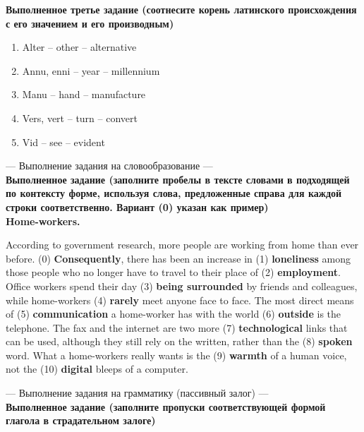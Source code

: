 \documentclass[main.tex]{subfiles}
\begin{document}
\textbf{Выполненное третье задание (соотнесите корень латинского происхождения с его значением и его производным)}

\begin{enumerate}[nosep]
	\itemsep\eitsp
	\item Alter -- other -- alternative
	\item Annu, enni -- year -- millennium
	\item Manu -- hand -- manufacture
	\item Vers, vert -- turn -- convert
	\item Vid -- see -- evident
\end{enumerate}
\vspace{7pt}

\newpage
{}

--- Выполнение задания на словообразование ---
\\

\textbf{Выполненное задание (заполните пробелы в тексте словами в подходящей по контексту форме, используя слова, предложенные справа для каждой строки соответственно. Вариант (0) указан как пример)}
\\

\textbf{Home-workers.}

According to government research, more people are working from home than ever before.
(0) \textbf{Consequently}, there has been an increase in (1) \textbf{loneliness} among those people who no longer have to travel to their place of (2) \textbf{employment}.
Office workers spend their day (3) \textbf{being surrounded} by friends and colleagues, while home-workers (4) \textbf{rarely} meet anyone face to face.
The most direct means of (5) \textbf{communication} a home-worker has with the world (6) \textbf{outside} is the telephone.
The fax and the internet are two more (7) \textbf{technological} links that can be used, although they still rely on the written, rather than the (8) \textbf{spoken} word.
What a home-workers really wants is the (9) \textbf{warmth} of a human voice, not the (10) \textbf{digital} bleeps of a computer.
\\

\newpage
{}

--- Выполнение задания на грамматику (пассивный залог) ---
\\

\textbf{Выполненное задание (заполните пропуски соответствующей формой глагола в страдательном залоге)}
\end{document}
